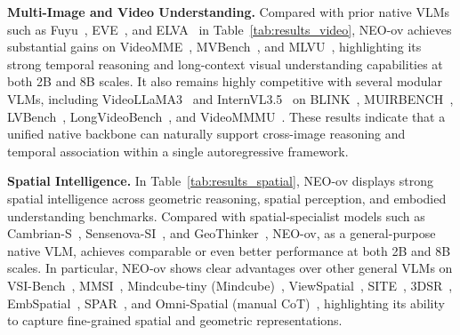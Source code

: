 \documentclass{llmxive}
\begin{document}
\textbf{Multi-Image and Video Understanding.}
Compared with prior native VLMs such as Fuyu~\cite{VLM:Fuyu-8b}, EVE~\cite{VLM:EVE}, and ELVA~\cite{VLM:ELVA} in Table~\ref{tab:results_video}, NEO-ov achieves substantial gains on VideoMME~\cite{fu2025videomme}, MVBench~\cite{li2024mvbench}, and MLVU~\cite{zhou2025mlvu}, highlighting its strong temporal reasoning and long-context visual understanding capabilities at both 2B and 8B scales.
It also remains highly competitive with several modular VLMs, including VideoLLaMA3~\cite{VLM:VideoLLaMA3} and InternVL3.5~\cite{VLM:InternVL-3.5} on BLINK~\cite{fu2024blink}, MUIRBENCH~\cite{wang2025muirbench}, LVBench~\cite{wang2025lvbench}, LongVideoBench~\cite{wu2024longvideobench}, and VideoMMMU~\cite{hu2025videommmu}. These results indicate that a unified native backbone can naturally support cross-image reasoning and temporal association within a single autoregressive framework.

\textbf{Spatial Intelligence.}
In Table~\ref{tab:results_spatial}, NEO-ov displays strong spatial intelligence across geometric reasoning, spatial perception, and embodied understanding benchmarks. Compared with spatial-specialist models such as Cambrian-S~\cite{yang2025cambrian-s}, Sensenova-SI~\cite{cai2025sensenova-si}, and GeoThinker~\cite{li2026geothinker}, NEO-ov, as a general-purpose native VLM, achieves comparable or even better performance at both 2B and 8B scales. In particular, NEO-ov shows clear advantages over other general VLMs on VSI-Bench~\cite{yang2025vsi-bench}, MMSI~\cite{yang2025mmsi}, Mindcube-tiny (Mindcube)~\cite{wang2025mindcube}, ViewSpatial~\cite{li2025viewspatial}, SITE~\cite{wang2025site}, 3DSR~\cite{ma20253dsrbench}, EmbSpatial~\cite{du2024embspatial}, SPAR~\cite{zhang2026spar}, and Omni-Spatial (manual CoT)~\cite{jia2025omnispatial}, highlighting its ability to capture fine-grained spatial and geometric representations.


\end{document}
